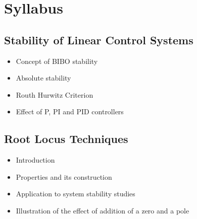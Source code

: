 \documentclass[../course]{subfiles}
\begin{document}
\section{Syllabus}

\subsection{Stability of Linear Control Systems}

\begin{itemize}

    \item Concept of BIBO stability
    \item Absolute stability
    \item Routh Hurwitz Criterion
    \item Effect of P, PI and PID controllers

\end{itemize}

\subsection{Root Locus Techniques}

\begin{itemize}

    \item Introduction
    \item Properties and its construction
    \item Application to system stability studies
    \item Illustration of the effect of addition of a zero and a pole

\end{itemize}
\end{document}
